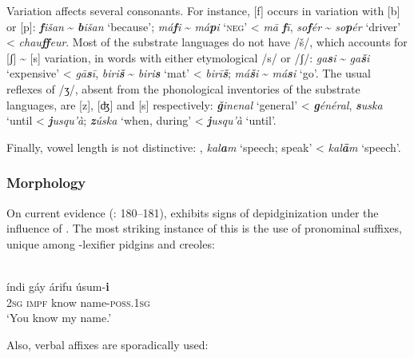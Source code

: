 \documentclass[output=paper]{langsci/langscibook}
\begin{document}
   Variation affects several consonants. For instance, [f] occurs in variation with [b] or [p]:  \textit{\textbf{f}išan} {\textasciitilde} \textit{\textbf{b}išan} ‘because’;   \textit{má}\textit{\textbf{f}i} {\textasciitilde} \textit{má}\textit{\textbf{p}i} ‘\textsc{neg}’ <  \textit{mā} \textit{\textbf{f}ī}, \textit{so}\textit{\textbf{f}ér} {\textasciitilde} \textit{so}\textit{\textbf{p}ér} ‘driver’ <  \textit{chau}\textit{\textbf{ff}eur}. Most of the {substrate} languages do not have /š/, which accounts for [ʃ] {\textasciitilde} [s] variation, in words with either etymological /s/ or /ʃ/:  \textit{ga\textbf{s}i} {\textasciitilde} \textit{ga\textbf{š}i} ‘expensive’ <  \textit{gā\textbf{s}ī}, \textit{biri\textbf{š}} {\textasciitilde} \textit{biri\textbf{s}} ‘mat’ <  \textit{birī\textbf{š}};   \textit{má\textbf{š}i} {\textasciitilde} \textit{má\textbf{s}i} ‘go’. The usual reflexes of  /ʒ/, absent from the phonological inventories of the {substrate} languages, are [z], [ʤ] and [s] respectively:  \textit{\textbf{ǧ}inenal} ‘general’ <  \textit{\textbf{g}énéral}, \textit{\textbf{s}uska} ‘until <  \textit{\textbf{j}usqu’à};   \textit{\textbf{z}úska} `when, during' <  \textit{\textbf{j}usqu’à} `until'.

Finally, {vowel length} is not distinctive: ,   \textit{kal\textbf{a}m} ‘speech; speak’ <  \textit{kal\textbf{ā}m} ‘speech’.


 \subsubsection{Morphology}

On current evidence (\citealt{Luffin2013}: 180–181),   exhibits signs of depidginization under the influence of  . The most striking instance of this is the use of pronominal suffixes, unique among -{lexifier} pidgins and creoles:

\ea
{  \citep[180]{Luffin2013}}\\
\gll    índi gáy árifu úsum-\textbf{i} \\
        2\textsc{sg} \textsc{impf} know name-\textsc{poss}.1\textsc{sg}\\
\glt    `You know my name.'
\z
 
\noindent Also, verbal affixes are sporadically used:
\end{document}
